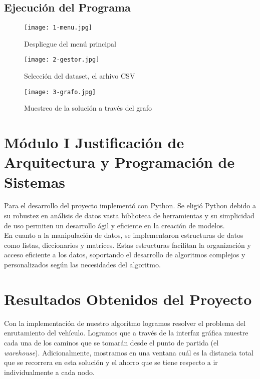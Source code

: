 \documentclass[10pt,twocolumn,letterpaper]{article}
\begin{document}
\subsection{Ejecución del Programa}

\begin{figure}[h]
  \centering
  \texttt{[image: 1-menu.jpg]}
  \caption{Despliegue del menú principal}
\end{figure}

\begin{figure}[h]
  \centering
  \texttt{[image: 2-gestor.jpg]}
  \caption{Selección del dataset, el arhivo CSV}
\end{figure}

\begin{figure}[h]
  \centering
  \texttt{[image: 3-grafo.jpg]}
  \caption{Muestreo de la solución a través del grafo}
\end{figure}

\section*{Módulo I Justificación de Arquitectura y Programación de Sistemas}
Para el desarrollo del proyecto implementó con Python. Se eligió Python debido a su robustez en análisis de datos vasta biblioteca de herramientas y su simplicidad de uso permiten un desarrollo ágil y eficiente en la creación de modelos.\\

En cuanto a la manipulación de datos, se implementaron estructuras de datos como listas, diccionarios y matrices. Estas estructuras facilitan la organización y acceso eficiente a los datos, soportando el desarrollo de algoritmos complejos y personalizados según las necesidades del algoritmo.

\section{Resultados Obtenidos del Proyecto}
Con la implementación de nuestro algoritmo logramos resolver el problema del enrutamiento del vehículo. Logramos que a través de la interfaz gráfica muestre cada una de los caminos que se tomarán desde el punto de partida (el \textit{warehouse}). Adicionalmente, mostramos en una ventana cuál es la distancia total que se recorrera en esta solución y el ahorro que se tiene respecto a ir individualmente a cada nodo.
\end{document}
